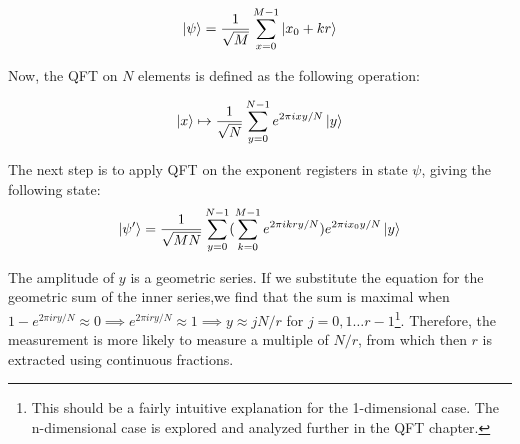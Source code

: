  \begin{equation}
    \ket{\psi} = \frac{1}{\sqrt{M}} \sum_{x=0}^{M-1} \ket{x_0 + kr} 
\end{equation}

Now, the QFT on $N$ elements is defined as the following operation:

 \begin{equation}
    \ket{x} \mapsto\frac{1}{\sqrt{N}} \sum_{y=0}^{N-1} e^{2\pi ixy/N}\ket{y} 
\end{equation}

The next step is to apply QFT on the exponent registers in state $\psi$, giving the following state:
\begin{equation}
    \ket{\psi'} =  \frac{1}{\sqrt{MN}} \sum_{y=0}^{N-1} (\sum_{k=0}^{M-1} e^{2\pi ikry/N})e^{2\pi ix_0y/N}\ket{y} 
\end{equation}

The amplitude of $y$ is a geometric series. If we substitute the equation for the geometric sum of the inner series,we find that the sum is maximal when $1 - e^{2\pi iry/N}\approx 0 \implies e^{2\pi iry/N} \approx 1 \implies y \approx jN/r $ for $j = 0,1\dots r-1$\footnote{This should be a fairly intuitive explanation for the 1-dimensional case. The n-dimensional case is explored and analyzed further in the QFT chapter.}. Therefore, the measurement is  more likely to measure a multiple of $N/r$, from which then $r$ is extracted using continuous fractions.

